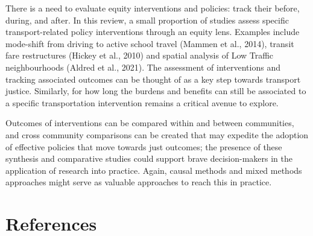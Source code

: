 \documentclass[
  letterpaper,
  DIV=11,
  numbers=noendperiod]{scrartcl}
\begin{document}
There is a need to evaluate equity interventions and policies: track
their before, during, and after. In this review, a small proportion of
studies assess specific transport-related policy interventions through
an equity lens. Examples include mode-shift from driving to active
school travel (Mammen et al., 2014), transit fare restructures (Hickey
et al., 2010) and spatial analysis of Low Traffic neighbourhoods (Aldred
et al., 2021). The assessment of interventions and tracking associated
outcomes can be thought of as a key step towards transport justice.
Similarly, for how long the burdens and benefits can still be associated
to a specific transportation intervention remains a critical avenue to
explore.

Outcomes of interventions can be compared within and between
communities, and cross community comparisons can be created that may
expedite the adoption of effective policies that move towards just
outcomes; the presence of these synthesis and comparative studies could
support brave decision-makers in the application of research into
practice. Again, causal methods and mixed methods approaches might serve
as valuable approaches to reach this in practice.

\section{References}\label{references}
\end{document}
